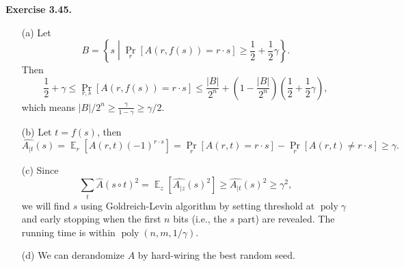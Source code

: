 \documentclass[a4paper]{article}
\newenvironment{exercise}[1]{
	\par
	\noindent\textbf{Exercise #1.}\quad
}{
	\par
	\bigskip
}
\DeclareMathOperator{\E}{\mathbb E}
\DeclareMathOperator{\poly}{\mathrm{poly}}
\newcommand{\pbra}[1]{{\left( #1 \right)}}
\newcommand{\cbra}[1]{{\left\{ #1 \right\}}}
\newcommand{\sbra}[1]{{\left[ #1 \right]}}
\begin{document}
\begin{exercise}{3.45}
    \begin{itemize}
        \item[(a)] Let
            $$
            B=\cbra{s\middle|\Pr_r\sbra{A(r,f(s))=r\cdot s}\geq\frac12+\frac12\gamma}.
            $$
            Then 
            $$
            \frac12+\gamma\leq\Pr_{r,s}\sbra{A(r,f(s))=r\cdot s}\leq\frac{|B|}{2^n}+\pbra{1-\frac{|B|}{2^n}}\pbra{\frac12+\frac12\gamma},
            $$
            which means $|B|/2^n\geq\frac{\gamma}{1-\gamma}\geq\gamma/2$.
        \item[(b)] Let $t=f(s)$, then
            $$
            \widehat{A_{|t}}(s)=\E_r\sbra{A(r,t)(-1)^{r\cdot s}}=\Pr_r[A(r,t)=r\cdot s]-\Pr_r[A(r,t)\neq r\cdot s]
            \geq\gamma.
            $$
        \item[(c)] Since
            $$
            \sum_{t}\hat A(s\circ t)^2=\E_z\sbra{\widehat{A_{|z}}(s)^2}\geq\widehat{A_{|t}}(s)^2\geq\gamma^2,
            $$
            we will find $s$ using Goldreich-Levin algorithm by setting threshold at $\poly\gamma$ and early stopping when
            the first $n$ bits (i.e., the $s$ part) are revealed.
            The running time is within $\poly(n,m,1/\gamma)$.
        \item[(d)] We can derandomize $A$ by hard-wiring the best random seed.
    \end{itemize}
\end{exercise}
\end{document}
